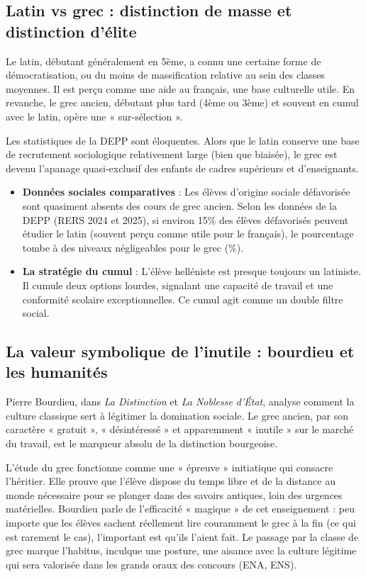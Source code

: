 \subsection{Latin vs grec : distinction de masse et distinction d'élite}

Le latin, débutant généralement en 5ème, a connu une certaine forme de démocratisation, ou du moins
de massification relative au sein des classes moyennes. Il est perçu comme une aide au français, une
base culturelle utile. En revanche, le grec ancien, débutant plus tard (4ème ou 3ème) et souvent en
cumul avec le latin, opère une « sur-sélection ».\cite{I-3-1-ref13}

Les statistiques de la DEPP sont éloquentes. Alors que le latin conserve une base de recrutement
sociologique relativement large (bien que biaisée), le grec est devenu l'apanage quasi-exclusif des
enfants de cadres supérieurs et d'enseignants.

\begin{itemize}\item \textbf{Données sociales comparatives} : Les élèves d'origine sociale défavorisée sont quasiment absents des cours de grec ancien. Selon les données de la DEPP (RERS 2024 et 2025), si environ 15\% des élèves défavorisés peuvent étudier le latin (souvent perçu comme utile pour le français), le pourcentage tombe à des niveaux négligeables pour le grec (\%).\cite{I-3-1-ref24}\item \textbf{La stratégie du cumul} : L'élève helléniste est presque toujours un latiniste. Il cumule deux options lourdes, signalant une capacité de travail et une conformité scolaire exceptionnelles. Ce cumul agit comme un double filtre social.\end{itemize}

\subsection{La valeur symbolique de l'inutile : bourdieu et les humanités}

Pierre Bourdieu, dans \textit{La Distinction} et \textit{La Noblesse d'État}, analyse comment la
culture classique sert à légitimer la domination sociale. Le grec ancien, par son caractère «
gratuit », « désintéressé » et apparemment « inutile » sur le marché du travail, est le marqueur
absolu de la distinction bourgeoise.\cite{I-3-1-ref27}

L'étude du grec fonctionne comme une « épreuve » initiatique qui consacre l'héritier. Elle prouve
que l'élève dispose du temps libre et de la distance au monde nécessaire pour se plonger dans des
savoirs antiques, loin des urgences matérielles. Bourdieu parle de l'efficacité « magique » de cet
enseignement : peu importe que les élèves sachent réellement lire couramment le grec à la fin (ce
qui est rarement le cas), l'important est qu'ils l'aient fait. Le passage par la classe de grec
marque l'habitus, inculque une posture, une aisance avec la culture légitime qui sera valorisée dans
les grands oraux des concours (ENA, ENS).\cite{I-3-1-ref29}



